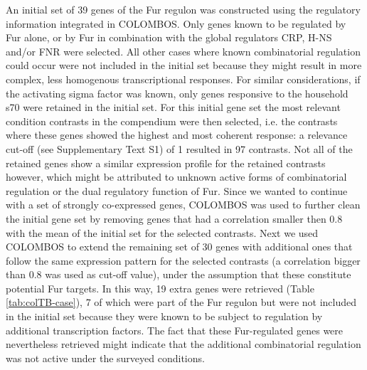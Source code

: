 An initial set of 39 genes of the Fur regulon was constructed using the 
regulatory information integrated in COLOMBOS. Only genes known to be regulated 
by Fur alone, or by Fur in combination with the global regulators CRP, H-NS 
and/or FNR were selected. All other cases where known combinatorial regulation 
could occur were not included in the initial set because they might result in 
more complex, less homogenous transcriptional responses. For similar 
considerations, if the activating sigma factor was known, only genes responsive 
to the household s70 were retained in the initial set. For this initial gene 
set the most relevant condition contrasts in the compendium were then selected, 
i.e. the contrasts where these genes showed the highest and most coherent 
response: a relevance cut-off (see Supplementary Text S1) of 1 resulted in 97 
contrasts. Not all of the retained genes show a similar expression profile for 
the retained contrasts however, which might be attributed to unknown active 
forms of combinatorial regulation or the dual regulatory function of Fur. Since 
we wanted to continue with a set of strongly co-expressed genes, COLOMBOS was 
used to further clean the initial gene set by removing genes that had a 
correlation smaller then 0.8 with the mean of the initial set for the selected 
contrasts. Next we used COLOMBOS to extend the remaining set of 30 genes with 
additional ones that follow the same expression pattern for the selected 
contrasts (a correlation bigger than 0.8 was used as cut-off value), under the 
assumption that these constitute potential Fur targets. In this way, 19 extra 
genes were retrieved (Table \ref{tab:colTB-case}), 7 of which were part of the 
Fur regulon but were not included in the initial set because they were known to 
be subject to regulation by additional transcription factors. The fact that 
these Fur-regulated genes were nevertheless retrieved might indicate that the 
additional combinatorial regulation was not active under the surveyed 
conditions.



